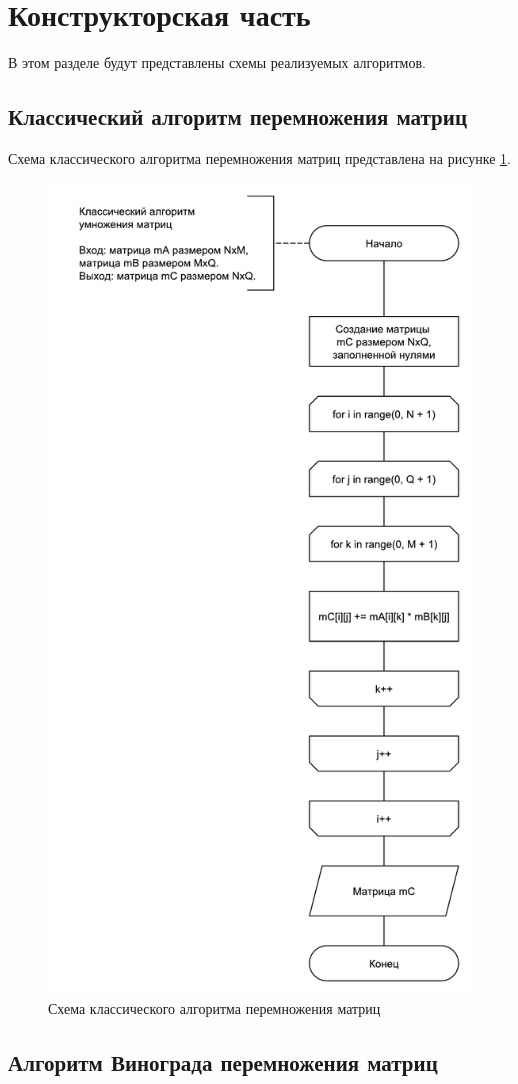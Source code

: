 \section{Конструкторская часть}

В этом разделе будут представлены схемы реализуемых алгоритмов.

\newpage

\subsection{Классический алгоритм перемножения матриц}

Схема классического алгоритма перемножения матриц представлена на рисунке \ref{fig:classic}.
\begin{figure}
	\centering
	\includegraphics[width=0.6\linewidth]{images/classic}
	\caption{Схема классического алгоритма перемножения матриц}
	\label{fig:classic}
\end{figure}

\newpage

\subsection{Алгоритм Винограда перемножения матриц}

